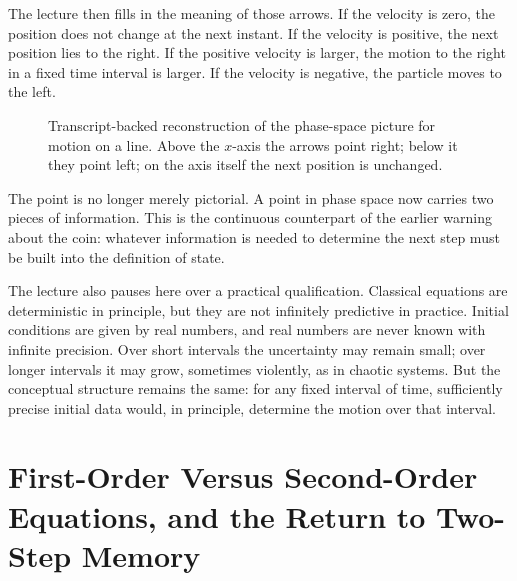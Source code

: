 The lecture then fills in the meaning of those arrows. If the velocity is zero, the position does not change at the next instant. If the velocity is positive, the next position lies to the right. If the positive velocity is larger, the motion to the right in a fixed time interval is larger. If the velocity is negative, the particle moves to the left.

\begin{figure}[htbp]
\centering
{}
\caption{Transcript-backed reconstruction of the phase-space picture for motion on a line. Above the \(x\)-axis the arrows point right; below it they point left; on the axis itself the next position is unchanged.}
\end{figure}

The point is no longer merely pictorial. A point in phase space now carries two pieces of information. This is the continuous counterpart of the earlier warning about the coin: whatever information is needed to determine the next step must be built into the definition of state.

The lecture also pauses here over a practical qualification. Classical equations are deterministic in principle, but they are not infinitely predictive in practice. Initial conditions are given by real numbers, and real numbers are never known with infinite precision. Over short intervals the uncertainty may remain small; over longer intervals it may grow, sometimes violently, as in chaotic systems. But the conceptual structure remains the same: for any fixed interval of time, sufficiently precise initial data would, in principle, determine the motion over that interval.

\section{First-Order Versus Second-Order Equations, and the Return to Two-Step Memory}

